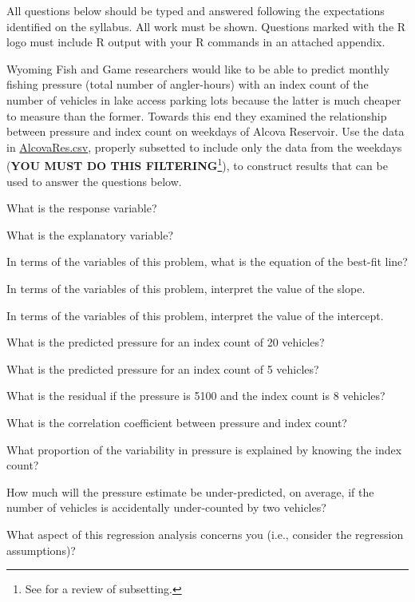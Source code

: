 \documentclass[10pt,openany]{book}\usepackage[]{graphicx}\usepackage[]{color}
\begin{document}
\vspace{36pt}
\begin{hwsection}{All questions below should be typed and answered following the expectations identified on the syllabus.  All work must be shown.  Questions marked with the R logo must include R output with your R commands in an attached appendix.}

  \item \label{hwprob:RegIndex} \rhw{} Wyoming Fish and Game researchers would like to be able to predict monthly fishing pressure (total number of angler-hours) with an index count of the number of vehicles in lake access parking lots because the latter is much cheaper to measure than the former. Towards this end they examined the relationship between pressure and index count on weekdays of Alcova Reservoir.  Use the data in \href{https://raw.githubusercontent.com/droglenc/NCData/master/AlcovaRes.csv}{AlcovaRes.csv}, properly subsetted to include only the data from the weekdays (\textbf{YOU MUST DO THIS FILTERING}\footnote{See  for a review of subsetting.}), to construct results that can be used to answer the questions below.
    \begin{Enumerate}
      \item What is the response variable?
      \item What is the explanatory variable?
      \item In terms of the variables of this problem, what is the equation of the best-fit line?
      \item In terms of the variables of this problem, interpret the value of the slope.
      \item In terms of the variables of this problem, interpret the value of the intercept.
      \item What is the predicted pressure for an index count of 20 vehicles?
      \item What is the predicted pressure for an index count of 5 vehicles?
      \item What is the residual if the pressure is 5100 and the index count is 8 vehicles?
      \item What is the correlation coefficient between pressure and index count?
      \item What proportion of the variability in pressure is explained by knowing the index count?
      \item How much will the pressure estimate be under-predicted, on average, if the number of vehicles is accidentally under-counted by two vehicles?
      \item What aspect of this regression analysis concerns you (i.e., consider the regression assumptions)?
    \end{Enumerate}

\end{hwsection}
\end{document}
